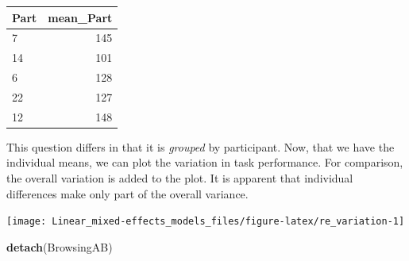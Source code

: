 \documentclass[]{svmono}
\newenvironment{Shaded}{\begin{snugshade}}{\end{snugshade}}
\newcommand{\KeywordTok}[1]{\textcolor[rgb]{0.13,0.29,0.53}{\textbf{#1}}}
\newcommand{\DataTypeTok}[1]{\textcolor[rgb]{0.13,0.29,0.53}{#1}}
\newcommand{\DecValTok}[1]{\textcolor[rgb]{0.00,0.00,0.81}{#1}}
\newcommand{\StringTok}[1]{\textcolor[rgb]{0.31,0.60,0.02}{#1}}
\newcommand{\OperatorTok}[1]{\textcolor[rgb]{0.81,0.36,0.00}{\textbf{#1}}}
\newcommand{\NormalTok}[1]{#1}
\begin{document}
\begin{tabular}{l|r}
\hline
Part & mean\_Part\\
\hline
7 & 145\\
\hline
14 & 101\\
\hline
6 & 128\\
\hline
22 & 127\\
\hline
12 & 148\\
\hline
\end{tabular}

This question differs in that it is \emph{grouped} by participant. Now,
that we have the individual means, we can plot the variation in task
performance. For comparison, the overall variation is added to the plot.
It is apparent that individual differences make only part of the overall
variance.

\begin{Shaded}
\end{Shaded}

\texttt{[image: Linear\_mixed-effects\_models\_files/figure-latex/re\_variation-1]}

\begin{Shaded}
\begin{Highlighting}[]
\KeywordTok{detach}\NormalTok{(BrowsingAB)}
\end{Highlighting}
\end{Shaded}
\end{document}
